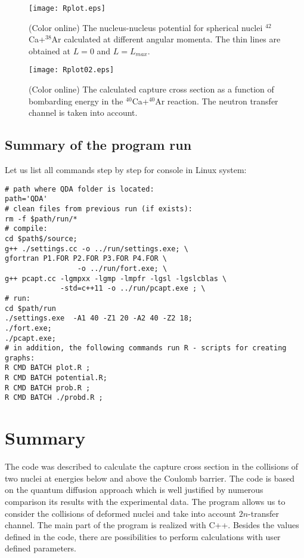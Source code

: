 \documentclass[preprint,review,12pt]{elsarticle}
\newcounter{bla}
\begin{document}
\begin{description}
\begin{figure}[h!]
  \texttt{[image: Rplot.eps]}
  \caption{(Color online) The nucleus-nucleus potential for spherical nuclei $^{42}$Ca+$^{38}$Ar calculated at
  different angular momenta. The thin lines are obtained at $L=0$ and $L=L_{max}$.}
\end{figure}

\begin{figure}[h!]
  \texttt{[image: Rplot02.eps]}
  \caption{(Color online) The calculated capture cross section as a function of
   bombarding energy in the $^{40}$Ca+$^{40}$Ar reaction. The neutron transfer channel is taken into account.
   }
\end{figure}

  \subsection{Summary of the program run}
  Let us list all commands step by step for console in Linux system:
        \begin{verbatim}
# path where QDA folder is located:
path='QDA'
# clean files from previous run (if exists):
rm -f $path/run/*
# compile:
cd $path$/source;
g++ ./settings.cc -o ../run/settings.exe; \
gfortran P1.FOR P2.FOR P3.FOR P4.FOR \
                 -o ../run/fort.exe; \
g++ pcapt.cc -lgmpxx -lgmp -lmpfr -lgsl -lgslcblas \
             -std=c++11 -o ../run/pcapt.exe ; \
# run:
cd $path/run
./settings.exe  -A1 40 -Z1 20 -A2 40 -Z2 18;
./fort.exe;
./pcapt.exe;
# in addition, the following commands run R - scripts for creating graphs:
R CMD BATCH plot.R ;
R CMD BATCH potential.R;
R CMD BATCH prob.R ;
R CMD BATCH ./probd.R ;
        \end{verbatim}



    \end{description}

\section{Summary}
The code was described to calculate the capture cross section in the collisions of
two nuclei at energies below and above the Coulomb barrier. The code is based on
the quantum diffusion approach which is well justified by numerous comparison its results with
the experimental data. The program allows us to consider the collisions of deformed nuclei
and take into account $2n$-transfer channel. The main part of the program is realized with C++.
Besides the values defined in the code, there are possibilities to perform calculations with
user defined parameters.
\end{document}
